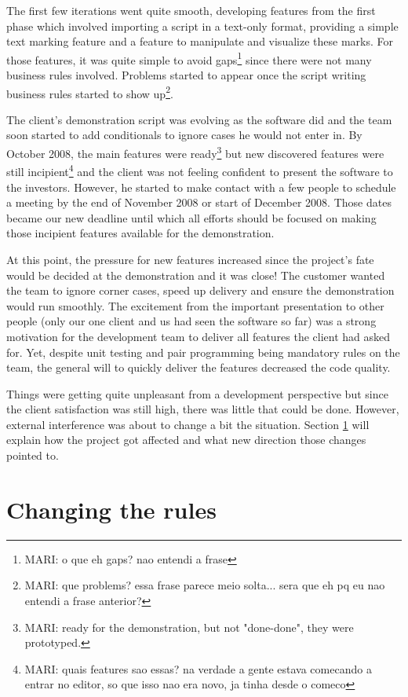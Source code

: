 \documentclass[lnbip]{svmultln}
\newcommand{\mari}[1]{\footnote{MARI: #1}}
\begin{document}
The first few iterations went quite smooth, developing features from the first phase which involved importing a script in a text-only format, providing a simple text marking feature and a feature to manipulate and visualize these marks.
For those features, it was quite simple to avoid gaps\mari{o que eh gaps? nao entendi a frase} since there were not many business rules involved. Problems started to appear once the script writing business rules started to show up\mari{que problems? essa frase parece meio solta... sera que eh pq eu nao entendi a frase anterior?}.


The client's demonstration script was evolving as the software did and the team soon started to add conditionals to ignore cases he would not enter in. By October 2008, the main features were ready\mari{ready for the demonstration, but not "done-done", they were prototyped.} but new discovered features were still incipient\mari{quais features sao essas? na verdade a gente estava comecando a entrar no editor, so que isso nao era novo, ja tinha desde o comeco} and the client was not feeling confident to present the software to the investors. However, he started to make contact with a few people to schedule a meeting by the end of November 2008 or start of December 2008. Those dates became our new deadline until which all efforts should be focused on making those incipient features available for the demonstration.

At this point, the pressure for new features increased since the project's fate would be decided at the demonstration and it was close! The customer wanted the team to ignore corner cases, speed up delivery and ensure the demonstration would run smoothly. The excitement from the important presentation to other people (only our one client and us had seen the software so far) was a strong motivation for the development team to deliver all features the client had asked for. Yet, despite unit testing and pair programming being mandatory rules on the team, the general will to quickly deliver the features decreased the code quality.

Things were getting quite unpleasant from a development perspective but since the client satisfaction was still high, there was little that could be done. However, external interference was about to change a bit the situation. Section \ref{sec:changes} will explain how the project got affected and what new direction those changes pointed to.

\section{Changing the rules}
\label{sec:changes}
\end{document}
